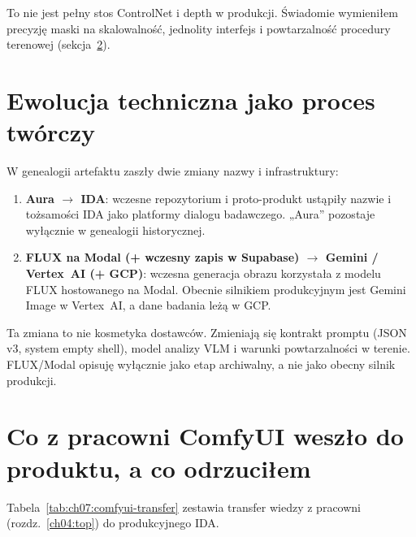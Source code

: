 To nie jest pełny stos ControlNet i depth w produkcji. Świadomie wymieniłem precyzję maski na skalowalność, jednolity interfejs i powtarzalność procedury terenowej (sekcja~\ref{ch07:sec:comfyui-transfer}).

\section{Ewolucja techniczna jako proces twórczy}
\label{ch07:sec:ewolucja}

W genealogii artefaktu zaszły dwie zmiany nazwy i infrastruktury:

\begin{enumerate}
  \item \textbf{Aura $\rightarrow$ IDA}: wczesne repozytorium i proto-produkt ustąpiły nazwie i tożsamości IDA jako platformy dialogu badawczego. „Aura” pozostaje wyłącznie w genealogii historycznej.
  \item \textbf{FLUX na Modal (+ wczesny zapis w Supabase) $\rightarrow$ Gemini / Vertex~AI (+ GCP)}: wczesna generacja obrazu korzystała z modelu FLUX hostowanego na Modal. Obecnie silnikiem produkcyjnym jest Gemini Image w Vertex~AI, a dane badania leżą w GCP.
\end{enumerate}

Ta zmiana to nie kosmetyka dostawców. Zmieniają się kontrakt promptu (JSON v3, system empty shell), model analizy VLM i warunki powtarzalności w terenie. FLUX/Modal opisuję wyłącznie jako etap archiwalny, a nie jako obecny silnik produkcji.

\section{Co z pracowni ComfyUI weszło do produktu, a co odrzuciłem}
\label{ch07:sec:comfyui-transfer}

Tabela~\ref{tab:ch07:comfyui-transfer} zestawia transfer wiedzy z pracowni (rozdz.~\ref{ch04:top}) do produkcyjnego IDA.

